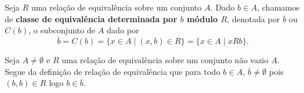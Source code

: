 \begin{definicao}
    Seja $R$ uma relação de equivalência sobre um conjunto $A$. Dado $b \in A$, chamamos de \textbf{classe de equivalência determinada por $b$ módulo $R$}, denotada por $\overline{b}$ ou $C(b)$, o subconjunto de $A$ dado por
    \[
        \overline{b} = C(b) = \{x \in A \mid (x,b) \in R\} = \{x \in A \mid xRb\}.
    \]
\end{definicao}

\begin{observacao}
    Seja $A \ne \emptyset$ e $R$ uma relação de equivalência sobre um conjunto não vazio $A$. Segue da definição de relação de equivalência que para todo $b \in A$, $\overline{b} \ne \emptyset$ pois $(b,b) \in R$ logo $b \in \overline{b}$.
\end{observacao}


